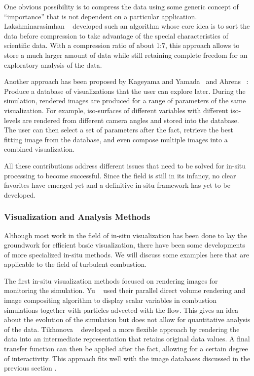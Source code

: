 %
One obvious possibility is to compress the data using some generic concept of
``importance'' that is not dependent on a particular application.
%
Lakshminarasimhan \etal~\cite{Lakshminarasimhan2011} developed such an algorithm
whose core idea is to sort the data before compression to take advantage of the
special characteristics of scientific data.
%
With a compression ratio of about 1:7, this approach allows to store a much larger
amount of data while still retaining complete freedom for an exploratory
analysis of the data.
%

%
Another approach has been proposed by Kageyama and Yamada~\cite{Kageyama2014}
and Ahrens \etal~\cite{Ahrens2014}:
%
Produce a database of visualizations that the user can explore later.
%
During the simulation, rendered images are produced for a range of parameters
of the same visualization.
%
For example, iso-surfaces of different variables with different iso-levels are
rendered from different camera angles and stored into the database.
%
The user can then select a set of parameters after the fact, retrieve the
best fitting image from the database, and even compose multiple images into
a combined visualization.
%

%
All these contributions address different issues that need to be solved for
in-situ processing to become successful.
%
Since the field is still in its infancy, no clear favorites have emerged yet and
a definitive in-situ framework has yet to be developed.
%
%
\subsubsection{Visualization and Analysis Methods} %
\label{ssub:visualization_and_analysis_methods}
%
Although most work in the field of in-situ visualization has been done to lay
the groundwork for efficient basic visualization, there have been some
developments of more specialized in-situ methods.
%
We will discuss some examples here that are applicable to the field of turbulent
combustion.
%

%
The first in-situ visualization methods focused on rendering images for
monitoring the simulation.
%
Yu \etal~\cite{Yu2010} used their parallel direct volume rendering and image
compositing algorithm \cite{Yu2008} to display scalar variables in combustion
simulations together with particles advected with the flow.
%
This gives an idea about the evolution of the simulation but does not allow for
quantitative analysis of the data.
%
Tikhonova \etal~\cite{Tikhonova2011} developed a more flexible approach by
rendering the data into an intermediate representation that retains original
data values.
%
A final transfer function can then be applied after the fact, allowing for a
certain degree of interactivity.
%
This approach fits well with the image databases discussed in the previous
section \cite{Kageyama2014,Ahrens2014}.
%

